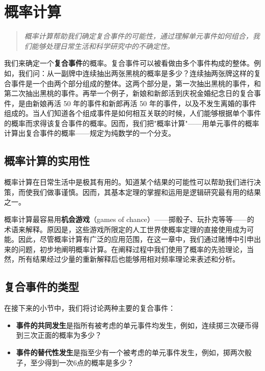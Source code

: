 \section{概率计算}

\begin{quotation}
\textit{概率计算帮助我们确定复合事件的可能性，通过理解单元事件如何组合，我们能够处理日常生活和科学研究中的不确定性。}
\end{quotation}

我们来确定一个\textbf{复合事件}的概率。复合事件可以被看做由多个事件构成的整体。例如，我们问：从一副牌中连续抽出两张黑桃的概率是多少？连续抽两张牌这样的复合事件是一个由两个部分组成的整体。这两个部分是，第一次抽出黑桃的事件，和第二次抽出黑桃的事件。再举一个例子，新娘和新郎活到庆祝金婚纪念日的复合事件，是由新娘再活 50 年的事件和新郎再活 50 年的事件，以及不发生离婚的事件组成的。当人们知道各个组成事件是如何相互关联的时候，人们能够根据单个事件的概率而求得该复合事件的概率。因而，我们把"概率计算"——用单元事件的概率计算出复合事件的概率——规定为纯数学的一个分支。

\subsection{概率计算的实用性}

概率计算在日常生活中是极其有用的。知道某个结果的可能性可以帮助我们进行决策，而使我们做事谨慎。因而，其基本定理的掌握和运用是逻辑研究最有用的结果之一。

概率计算最容易用\textbf{机会游戏}（games of chance）——掷骰子、玩扑克等等——的术语来解释。原因是，这些游戏所限定的人工世界使概率定理的直接使用成为可能。因此，尽管概率计算有广泛的应用范围，在这一章中，我们通过赌博中引申出来的问题，初步地阐明概率计算。在阐释过程中我们使用了概率的先验理论，当然，所有结果经过少量的重新解释后也能够用相对频率理论来表述和分析。

\subsection{复合事件的类型}

在接下来的小节中，我们将讨论两种主要的复合事件：
\begin{itemize}
\item \textbf{事件的共同发生}是指所有被考虑的单元事件均发生，例如，连续掷三次硬币得到三次正面的概率为多少？
\item \textbf{事件的替代性发生}是指至少有一个被考虑的单元事件发生，例如，掷两次骰子，至少得到一次6点的概率是多少？
\end{itemize}

